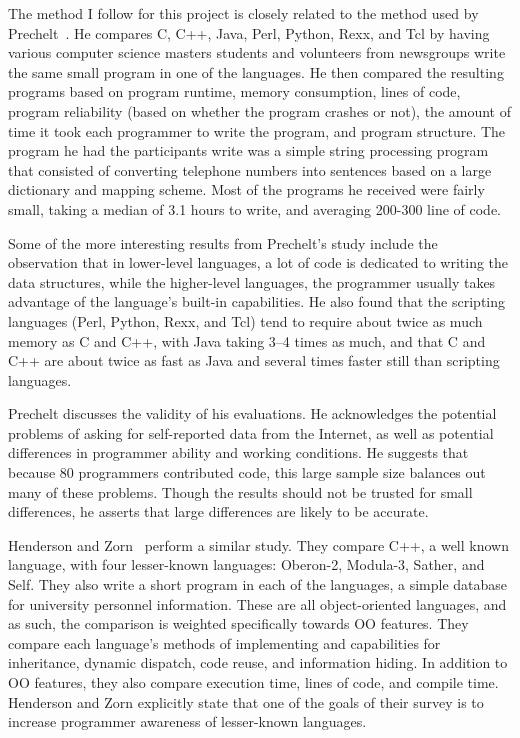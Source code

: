 \documentclass{article}
\begin{document}
The method I follow for this project is closely related to the method used by
Prechelt~\cite{Prechelt7LangComp}.  He compares C, C++, Java, Perl, Python,
Rexx, and Tcl by having various computer science masters students and
volunteers from newsgroups write the same small program in one of the
languages.  He then compared the resulting programs based on program runtime,
memory consumption, lines of code, program reliability (based on whether the
program crashes or not), the amount of time it took each programmer to write
the program, and program structure.  The program he had the participants write
was a simple string processing program that consisted of converting telephone
numbers into sentences based on a large dictionary and mapping scheme.  Most of
the programs he received were fairly small, taking a median of 3.1 hours to
write, and averaging 200-300 line of code.

Some of the more interesting results from Prechelt's study include the
observation that in lower-level languages, a lot of code is dedicated to
writing the data structures, while the higher-level languages, the programmer
usually takes advantage of the language's built-in capabilities.  He also found
that the scripting languages (Perl, Python, Rexx, and Tcl) tend to require
about twice as much memory as C and C++, with Java taking 3--4 times as much,
and that C and C++ are about twice as fast as Java and several times faster
still than scripting languages.

Prechelt discusses the validity of his evaluations.  He acknowledges the
potential problems of asking for self-reported data from the Internet, as well
as potential differences in programmer ability and working conditions.  He
suggests that because 80 programmers contributed code, this large sample size
balances out many of these problems.  Though the results should not be trusted
for small differences, he asserts that large differences are likely to be
accurate.

Henderson and Zorn~\cite{Henderson4OOLangComp} perform a similar study.  They
compare C++, a well known language, with four lesser-known languages: Oberon-2,
Modula-3, Sather, and Self.  They also write a short program in each of the
languages, a simple database for university personnel information.  These are
all object-oriented languages, and as such, the comparison is weighted
specifically towards OO features.  They compare each language's methods of
implementing and capabilities for inheritance, dynamic dispatch, code reuse,
and information hiding.  In addition to OO features, they also compare
execution time, lines of code, and compile time.  Henderson and Zorn explicitly
state that one of the goals of their survey is to increase programmer awareness
of lesser-known languages.
\end{document}
